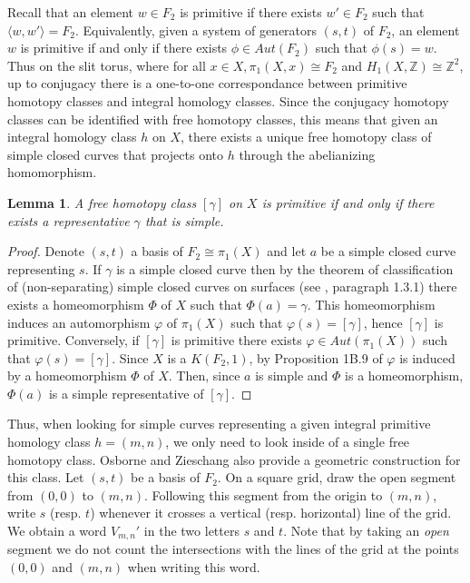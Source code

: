 \documentclass{article}
\newcommand{\ZZ}{\mathbb{Z}}
\newtheorem{lemma}[thm]{Lemma}
\theoremstyle{definition}
\begin{document}
Recall that an element $w\in F_2$ is primitive if there exists $w'\in F_2$ such that $\langle w,w' \rangle = F_2$. Equivalently, given a system of generators $(s,t)$ of $F_2$, an element $w$ is primitive if and only if there exists $\phi \in Aut(F_2)$ such that $\phi(s)=w$. Thus on the slit torus, where for all $ x \in X, \pi_1(X,x) \cong F_2$ and $ H_1(X,\ZZ)\cong\ZZ^2$, up to conjugacy there is a one-to-one correspondance between primitive homotopy classes and integral homology classes. Since the conjugacy homotopy classes  can be identified with free homotopy classes, this means that given an integral homology class $h$ on $X$, there exists a unique free homotopy class of simple closed curves that projects onto $h$ through the abelianizing homomorphism.

\begin{lemma}
	A free homotopy class $[\gamma]$ on $X$ is primitive if and only if there exists a representative $\gamma$ that is simple.
\end{lemma}

\begin{proof}
	Denote $(s,t)$ a basis of $F_2\cong \pi_1(X)$ and let $a$ be a simple closed curve representing $s$.
	If $\gamma$ is a simple closed curve then by the theorem of classification of (non-separating) simple closed curves on surfaces (see \cite{Farb-Marg}, paragraph 1.3.1) there exists a homeomorphism $\Phi$ of $X$ such that $\Phi(a) = \gamma$. This homeomorphism induces an automorphism $\varphi$ of $\pi_1(X)$ such that $\varphi(s) = [\gamma]$, hence $[\gamma]$ is primitive. Conversely, if $[\gamma]$ is primitive there exists $\varphi\in Aut(\pi_1(X))$ such that $\varphi(s) = [\gamma]$. Since $X$ is a $K(F_2,1)$, by Proposition 1B.9 of \cite{Hatcher} $\varphi$ is induced by a homeomorphism $\Phi$ of $X$. Then, since $a$ is simple and $\Phi$ is a homeomorphism, $\Phi(a)$ is a simple representative of $[\gamma]$.
\end{proof}


Thus, when looking for simple curves representing a given integral primitive homology class $h=(m,n)$, we only need to look inside of a single free homotopy class. Osborne and Zieschang also provide a geometric construction for this class. Let $(s,t)$ be a basis of $F_2$. On a square grid, draw the open segment from $(0,0)$ to $(m,n)$. Following this segment from the origin to $(m,n)$, write $s$ (resp. $t$) whenever it crosses a vertical (resp. horizontal) line of the grid. We obtain a word $V_{m,n}'$ in the two letters $s$ and $t$.  Note that by taking an \emph{open} segment we do not count the intersections with the lines of the grid at the points $(0,0)$ and $(m,n)$ when writing this word.
\end{document}
